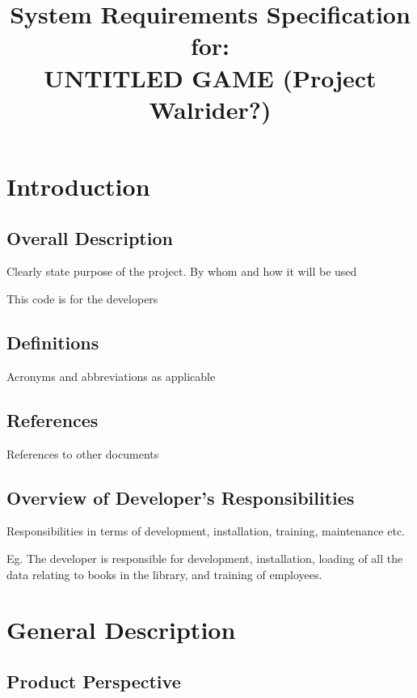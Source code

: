 \documentclass[a4wide]{article}
\title{System Requirements Specification for:\\ UNTITLED GAME (Project Walrider?)}
\begin{document}
\maketitle

\section{Introduction}

\subsection{Overall Description}



Clearly state purpose of the project.
By whom and how it will be used

This code is for the developers

\subsection{Definitions}

Acronyms and abbreviations as applicable

\subsection{References}

References to other documents

\subsection{Overview of Developer's Responsibilities}

Responsibilities in terms of development, installation, training, maintenance
etc.

Eg. The developer is responsible for development, installation,
loading of all the data relating to books in the library,
and training of employees.


\section{General Description}

\subsection{Product Perspective}
\end{document}
